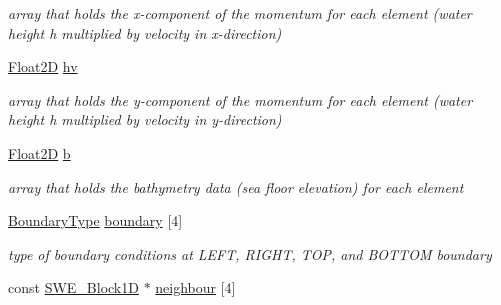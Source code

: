 \begin{DoxyCompactItemize}
\begin{DoxyCompactList}\small\item\em array that holds the x-\/component of the momentum for each element (water height h multiplied by velocity in x-\/direction) \end{DoxyCompactList}\item 
\hypertarget{classSWE__Block_a0897aa3c2d78749f209c95e08196d831}{\hyperlink{classFloat2D}{Float2\-D} \hyperlink{classSWE__Block_a0897aa3c2d78749f209c95e08196d831}{hv}}\label{classSWE__Block_a0897aa3c2d78749f209c95e08196d831}

\begin{DoxyCompactList}\small\item\em array that holds the y-\/component of the momentum for each element (water height h multiplied by velocity in y-\/direction) \end{DoxyCompactList}\item 
\hypertarget{classSWE__Block_af7487209129f40b26ea171762754a261}{\hyperlink{classFloat2D}{Float2\-D} \hyperlink{classSWE__Block_af7487209129f40b26ea171762754a261}{b}}\label{classSWE__Block_af7487209129f40b26ea171762754a261}

\begin{DoxyCompactList}\small\item\em array that holds the bathymetry data (sea floor elevation) for each element \end{DoxyCompactList}\item 
\hypertarget{classSWE__Block_a0e56d0cad169abd4f5de95d9f96c7a73}{\hyperlink{SWE__Scenario_8hh_af75d5dd7322fa39ed0af4e7839e600f8}{Boundary\-Type} \hyperlink{classSWE__Block_a0e56d0cad169abd4f5de95d9f96c7a73}{boundary} \mbox{[}4\mbox{]}}\label{classSWE__Block_a0e56d0cad169abd4f5de95d9f96c7a73}

\begin{DoxyCompactList}\small\item\em type of boundary conditions at L\-E\-F\-T, R\-I\-G\-H\-T, T\-O\-P, and B\-O\-T\-T\-O\-M boundary \end{DoxyCompactList}\item 
\hypertarget{classSWE__Block_a5ea4ea4815af9eb66c51de9ad9b8d148}{const \hyperlink{structSWE__Block1D}{S\-W\-E\-\_\-\-Block1\-D} $\ast$ \hyperlink{classSWE__Block_a5ea4ea4815af9eb66c51de9ad9b8d148}{neighbour} \mbox{[}4\mbox{]}}\label{classSWE__Block_a5ea4ea4815af9eb66c51de9ad9b8d148}


\end{DoxyCompactItemize}
